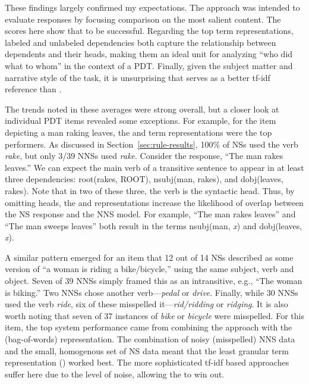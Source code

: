 These findings largely confirmed my expectations. The  approach was intended to evaluate responses by focusing comparison on the most salient content. The scores here show that to be successful. Regarding the top term representations, labeled and unlabeled dependencies both capture the relationship between dependents and their heads, making them an ideal unit for analyzing ``who did what to whom'' in the context of a PDT. Finally, given the subject matter and narrative style of the task, it is unsurprising that  serves as a better tf-idf reference than .

The trends noted in these averages were strong overall, but a closer look at individual PDT items revealed some exceptions. For example, for the item depicting a man raking leaves, the  and  term representations were the top performers. As discussed in Section~\ref{sec:rule-results}, 100\% of NSs used the verb \textit{rake}, but only 3/39 NNSs used \textit{rake}. Consider the response, ``The man rakes leaves.'' We can expect the main verb of a transitive sentence to appear in at least three dependencies: root(rakes, ROOT), nsubj(man, rakes), and dobj(leaves, rakes). Note that in two of these three, the verb is the syntactic head. Thus, by omitting heads, the  and  representations increase the likelihood of overlap between the NS response and the NNS model. For example, ``The man rakes leaves'' and ``The man sweeps leaves'' both result in the  terms nsubj(man, \textit{x}) and dobj(leaves, \textit{x}).

A similar pattern emerged for an item that 12 out of 14 NSs described as some version of ``a woman is riding a bike/bicycle,'' using the same subject, verb and object. Seven of 39 NNSs  simply framed this as an intransitive, e.g., ``The woman is biking.'' Two NNSs chose another verb---\textit{pedal} or \textit{drive}. Finally, while 30 NNSs used the verb \textit{ride}, six of these misspelled it---\textit{rid/ridding} or \textit{ridging}. It is also worth noting that seven of 37 instances of \textit{bike} or \textit{bicycle} were misspelled. For this item, the top system performance came from combining the  approach with the  (bag-of-words) representation. The combination of noisy (misspelled) NNS data and the small, homogenous set of NS data meant that the least granular term representation () worked best. The more sophisticated tf-idf based approaches suffer here due to the level of noise, allowing the  to win out.

